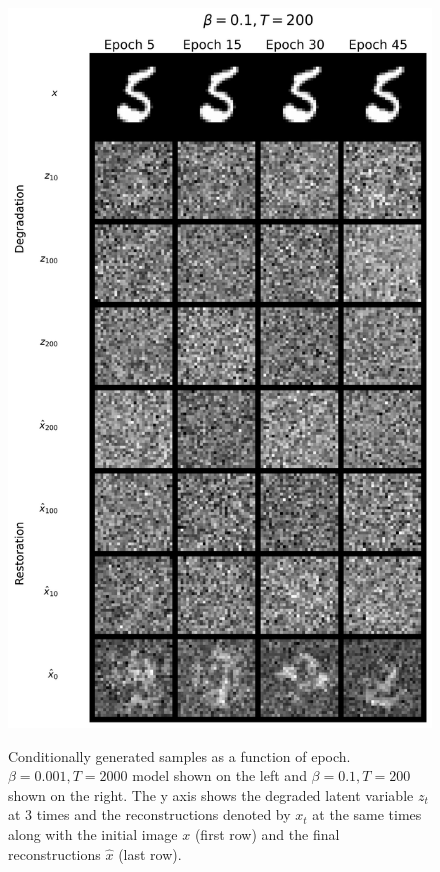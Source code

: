 \documentclass[11pt]{article}
\begin{document}
\begin{figure}[H]
\begin{minipage}{0.48\textwidth}
        \includegraphics[width=\linewidth]{figs/q1b_bad_cond_samples.png}
        \label{fig:train_cond_right_img}
    \end{minipage}
    \caption{Conditionally generated samples as a function of epoch. $\beta=0.001, T=2000$ model shown on the left and $\beta=0.1, T=200$ shown on the right. The y axis shows the degraded latent variable $z_t$ at 3 times and the reconstructions denoted by $x_t$ at the same times along with the initial image $x$ (first row) and the final reconstructions $\hat{x}$ (last row).}
    \label{fig:train_conditional_samples}
\end{figure}
\end{document}
